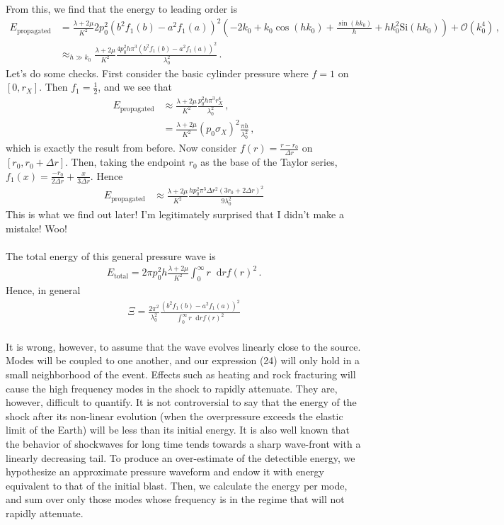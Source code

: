 \documentclass{article}
\newcommand*\diff{\mathop{}\!\mathrm{d}}
\newcommand*\scr[1]{\mathscr{#1}}
\newcommand*\te[1]{\text{#1}}
\newcommand*\p[1]{\left(#1\right)}
\newcommand*\f[2]{\frac{#1}{#2}}
\begin{document}
From this, we find that the energy to leading order is
\begin{align}
E_{\te{propagated}}&=\f{\lambda+2\mu}{K^2}2p_0^2(b^2f_1(b)-a^2f_1(a))^2\p{-2k_0+k_0\cos(h k_0)+\f{\sin(h k_0)}{h}+h k_0^2\te{Si}(h k_0)}+\scr O(k_0^4)\,,\\
&\approx_{h\gg k_0}\f{\lambda+2\mu}{K^2} \f{4 p_0^2h\pi^3(b^2 f_1(b)-a^2f_1(a))^2}{\lambda_0^2}\,.
\end{align}
Let's do some checks. First consider the basic cylinder pressure where $f=1$ on $[0,r_X]$. Then $f_1=\f12$, and we see that
\begin{align}
E_{\te{propagated}}&\approx\f{\lambda+2\mu}{K^2}\f{p_0^2h\pi^3r_X^4}{\lambda_0^2}\,,\\
&=\f{\lambda+2\mu}{K^2}(p_0\sigma_X)^2\f{\pi h}{\lambda_0^2}\,,
\end{align}
which is exactly the result from before. Now consider $f(r)=\f{r-r_0}{\Delta r}$ on $[r_0,r_0+\Delta r]$. Then, taking the endpoint $r_0$ as the base of the Taylor series, $f_1(x)=\f{-r_0}{2\Delta r}+\f{x}{3\Delta r}$. Hence
\begin{align}
E_{\te{propagated}}&\approx\f{\lambda+2\mu}{K^2}\f{h p_0^2\pi^3\Delta r^2(3r_0+2\Delta r)^2}{9\lambda_0^2}
\end{align}
This is what we find out later! I'm legitimately surprised that I didn't make a mistake! Woo!
\\\\
The total energy of this general pressure wave is
\begin{align}
E_{\te{total}} = 2\pi p_0^2h\f{\lambda+2\mu}{K^2}\int_0^\infty r\diff r f(r)^2\,.
\end{align}
Hence, in general
\begin{align}
\Xi = \f{2\pi^2}{\lambda_0^2}\f{(b^2 f_1(b)-a^2f_1(a))^2}{\int_0^\infty r\diff r f(r)^2}
\end{align}
\pagebreak
\\
It is wrong, however, to assume that the wave evolves linearly close to the source. Modes will be coupled to one another, and our expression (24) will only hold in a small neighborhood of the event. Effects such as heating and rock fracturing will cause the high frequency modes in the shock to rapidly attenuate. They are, however, difficult to quantify. It is not controversial to say that the energy of the shock after its non-linear evolution (when the overpressure exceeds the elastic limit of the Earth) will be less than its initial energy. It is also well known that the behavior of shockwaves for long time tends towards a sharp wave-front with a linearly decreasing tail. To produce an over-estimate of the detectible energy, we hypothesize an approximate pressure waveform and endow it with energy equivalent to that of the initial blast. Then, we calculate the energy per mode, and sum over only those modes whose frequency is in the regime that will not rapidly attenuate.
\end{document}

